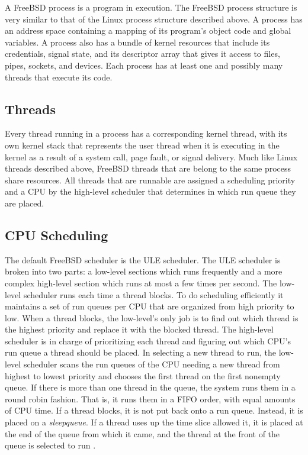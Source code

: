 \documentclass[onecolumn,draftclsnofoot, 10pt, compsoc]{IEEEtran}
\begin{document}
	
	A FreeBSD process is a program in execution. The FreeBSD process structure is very similar to that of the Linux process structure described above. A process has an address space containing a mapping of its program’s object code and global variables. A process also has a bundle of kernel resources that include its credentials, signal state, and its descriptor array that gives it access to files, pipes, sockets, and devices. Each process has at least one and possibly many threads that execute its code. 
\subsection{Threads}
	Every thread running in a process has a corresponding kernel thread, with its own kernel stack that represents the user thread when it is executing in the kernel as a result of a system call, page fault, or signal delivery. Much like Linux threads described above, FreeBSD threads that are belong to the same process share resources.
	All threads that are runnable are assigned a scheduling priority and a CPU by the high-level scheduler that determines in which run queue they are placed. 

\subsection{CPU Scheduling}
	The default FreeBSD scheduler is the ULE scheduler.
	The ULE scheduler is broken into two parts: a low-level sections which runs frequently and a more complex high-level section which runs at most a few times per second.
	The low-level scheduler runs each time a thread blocks.
	To do scheduling efficiently it maintains a set of run queues per CPU that are organized from high priority to low.
	When a thread blocks, the low-level's only job is to find out which thread is the highest priority and replace it with the blocked thread. 
	The high-level scheduler is in charge of prioritizing each thread and figuring out which CPU's run queue a thread should be placed.
	 In selecting a new thread to run, the low-level scheduler scans the run queues of the CPU needing a new thread from highest to lowest priority and chooses the first thread on the first nonempty queue.
	 If there is more than one thread in the queue, the system runs them in a round robin fashion. 
	 That is, it runs them in a FIFO order, with equal amounts of CPU time. 
	 If a thread blocks, it is not put back onto a run queue. 
	 Instead, it is placed on a \textit{sleepqueue}. 
	 If a thread uses up the time slice allowed it, it is placed at the end of the queue from which it came, and the thread at the front of the queue is selected to run \cite{freeBSDScheduler}.
 
\end{document}
